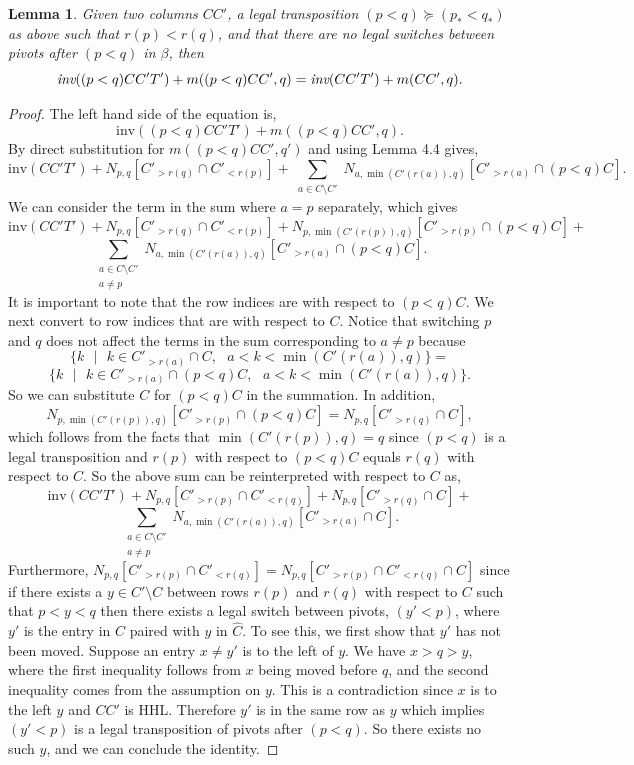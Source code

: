 \documentclass[11pt]{amsart}
\newtheorem{lemma}{Lemma}[section]
\begin{document}
{\begin{lemma}
Given two columns $CC'$, a legal transposition $(p<q)\succeq (p_{*}<q_{*})$ as above such that $r(p)<r(q)$, and that there are no legal switches between pivots after $(p<q)$ in $\beta$, then 
\[
\emph{inv} ( (p<q)CC'T')+m((p<q)CC',q)=\emph{inv} ( CC'T')+m(CC',q).
\]
\end{lemma}
\begin{proof}
The left hand side of the equation is,
\[
\text{inv} ( (p<q)CC'T')+m((p<q)CC',q).
\]
By direct substitution for $m((p<q)CC',q')$ and using Lemma 4.4 gives, 
\[
\text{inv}(CC'T')+N_{p,q}[C'_{>r(q)}\cap C'_{<r(p)}]+\sum_{\substack{a\in C\setminus C'}}N_{a,\min(C'(r(a)),q)}[C'_{>r(a)}\cap (p<q)C].
\]
We can consider the term in the sum where $a=p$ separately, which gives
\[
\text{inv}(CC'T')+N_{p,q}[C'_{>r(q)}\cap C'_{<r(p)}]+N_{p,\min(C'(r(p)),q)}[C'_{>r(p)}\cap (p<q)C]+
\]
\[
\sum_{\substack{a\in C\setminus C'\\a\neq p}}N_{a,\min(C'(r(a)),q)}[C'_{>r(a)}\cap (p<q)C].
\]
\indent It is important to note that the row indices are with respect to $(p<q)C$. We next convert to row indices that are with respect to $C$. Notice that switching $p$ and $q$ does not affect the terms in the sum corresponding to $a\neq p$ because 
\[
\{ k \text{ }|\text{ } k\in C'_{>r(a)}\cap C, \text{ } a<k<\min(C'(r(a)),q)\}=
\]
\[
\{ k \text{ }|\text{ } k\in C'_{>r(a)}\cap (p<q)C, \text{ } a<k<\min(C'(r(a)),q)\}.
\]
So we can substitute $C$ for $(p<q)C$ in the summation. In addition, 
$$N_{p,\min(C'(r(p)),q)}[C'_{>r(p)}\cap (p<q)C]=N_{p,q}[C'_{>r(q)}\cap C],$$ 
which follows from the facts that $\min(C'(r(p)),q)=q$ since $(p<q)$ is a legal transposition and $r(p)$ with respect to $(p<q)C$ equals $r(q)$ with respect to $C$. So the above sum can be reinterpreted with respect to $C$ as,
\[
\text{inv}(CC'T')+N_{p,q}[C'_{>r(p)}\cap C'_{<r(q)}]+N_{p,q}[C'_{>r(q)}\cap C]+
\]
\[
\sum_{\substack{a\in C\setminus C'\\a\neq p}}N_{a,\min(C'(r(a)),q)}[C'_{>r(a)}\cap C].
\]
\indent Furthermore, $N_{p,q}[C'_{>r(p)}\cap C'_{<r(q)}]=N_{p,q}[C'_{>r(p)}\cap C'_{<r(q)}\cap C]$ since if there exists a $y \in C'\setminus C$ between rows $r(p)$ and $r(q)$ with respect to $C$ such that $p<y<q$ then there exists a legal switch between pivots, $(y'<p)$, where $y'$ is the entry in $C$ paired with $y$ in $\widehat{C}$. To see this, we first show that $y'$ has not been moved. Suppose an entry $x\neq y'$ is to the left of $y$. We have $x>q>y$, where the first inequality follows from $x$ being moved before $q$, and the second inequality comes from the assumption on $y$. This is a contradiction since $x$ is to the left $y$ and $CC'$ is HHL. Therefore $y'$ is in the same row as $y$ which implies $(y'<p)$ is a legal transposition of pivots after $(p<q)$. So there exists no such $y$, and we can conclude the identity. 

\end{proof}}
\end{document}
